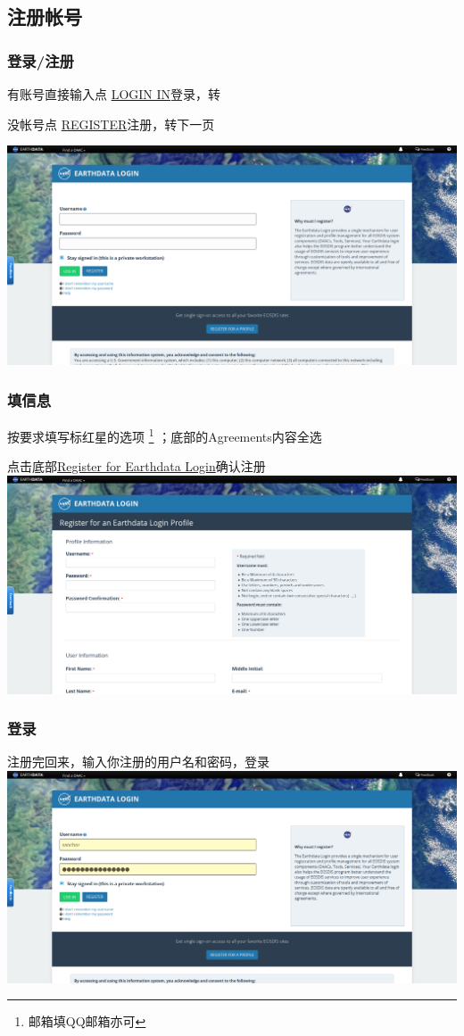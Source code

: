 \subsection{注册帐号}
\begin{frame}
    \frametitle{登录/注册}
    有账号直接输入点 \underline{LOGIN IN}登录，转
    \hyperlink{login}{}

    没帐号点 \underline{REGISTER}注册，转下一页

    \includegraphics[width=\linewidth]{images/4.登陆界面.png}
\end{frame}
\begin{frame}
    \frametitle{填信息}
    按要求填写标红星的选项
    \footnote{邮箱填QQ邮箱亦可}
    ；底部的Agreements内容全选

    点击底部\underline{Register for Earthdata Login}确认注册
    \includegraphics[width=\linewidth]{images/5.注册帐号.png}
\end{frame}
\begin{frame}[label=login]
    \frametitle{登录}
    注册完回来，输入你注册的用户名和密码，登录
    \includegraphics[width=\linewidth]{images/7.登录.png}
\end{frame}
